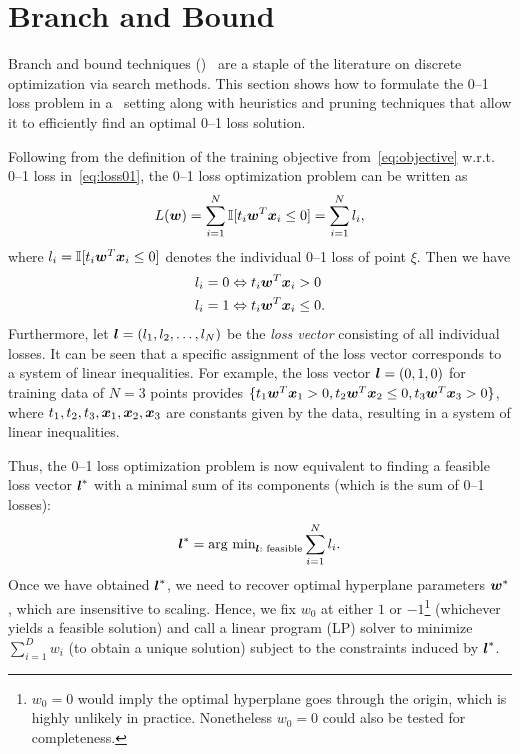 \section{Branch and Bound}
\label{cha:branchandbound}

Branch and bound techniques (\BB)~\cite{bandb} are a staple of the
literature on discrete optimization via search methods.  This section
shows how to formulate the 0--1 loss problem in a \BB\ setting along
with heuristics and pruning techniques that allow it to efficiently
find an optimal 0--1 loss solution.

Following from the definition of the training objective
from~\eqref{eq:objective} w.r.t. 0--1 loss in~\eqref{eq:loss01},
the 0--1 loss optimization problem can be written as
\begin{equation}
L(\boldsymbol{w}) = \sum_{i=1}^N \mathbb{I} [t_i \boldsymbol{w}^T \boldsymbol{x}_i \leq 0] = \sum_{i=1}^N l_i, \label{eq:loss01_data}
\end{equation}
where $l_i =\mathbb{I} [t_i \boldsymbol{w}^T \boldsymbol{x}_i \leq 0]$ denotes the individual
0--1 loss of point $\xi$.  Then we have
\[ \begin{split}
l_i = 0 &\Leftrightarrow t_i \boldsymbol{w}^T \boldsymbol{x}_i > 0 \\
l_i = 1 &\Leftrightarrow t_i \boldsymbol{w}^T \boldsymbol{x}_i \leq 0. \\
\end{split} \] 
Furthermore, let $\boldsymbol{l}=(l_1, l_2, \dots, l_N)$ be the \emph{loss vector}
consisting of all individual losses. It can be seen that a specific
assignment of the loss vector corresponds to a system of linear
inequalities. For example, the loss vector $\boldsymbol{l}=(0,1,0)$ for training
data of $N=3$ points provides 
$\{ t_1 \boldsymbol{w}^T \boldsymbol{x}_1 > 0, t_2 \boldsymbol{w}^T \boldsymbol{x}_2 \leq 0, t_3 \boldsymbol{w}^T \boldsymbol{x}_3 > 0 \}$, 
where $t_1, t_2, t_3, \boldsymbol{x}_1, \boldsymbol{x}_2, \boldsymbol{x}_3$ are constants given by the
data, resulting in a system of linear inequalities.

Thus, the 0--1 loss optimization problem is now equivalent to finding
a feasible loss vector $\boldsymbol{l}^*$ with a minimal sum of its components
(which is the sum of 0--1 losses):
\begin{equation}
\boldsymbol{l}^* = \text{arg min}_{\boldsymbol{l} : \text{ feasible}} \sum_{i=1}^N l_i. \label{eq:bb_obj}
\end{equation}
Once we have obtained $\boldsymbol{l}^*$, we need to recover optimal hyperplane
parameters $\boldsymbol{w}^*$, which are insensitive to scaling.  Hence, we fix
$w_0$ at either $1$ or $-1$\footnote{$w_0 = 0$ would imply the optimal
  hyperplane goes through the origin, which is highly unlikely in
  practice.  Nonetheless $w_0 = 0$ could also be tested for
  completeness.} (whichever yields a feasible solution) and call a
linear program (LP) solver to minimize $\sum_{i=1}^D w_i$ 
(to obtain a unique solution) subject to the constraints induced by $\boldsymbol{l}^*$.

